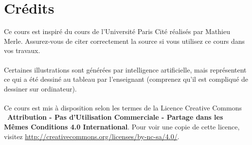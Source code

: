 \documentclass{article}
\begin{document}
\newpage
\tableofcontents
\section*{Crédits}
Ce cours est inspiré du cours de l'Université Paris Cité réalisés par Mathieu Merle. Assurez-vous de citer correctement la source si vous utilisez ce cours dans vos travaux.\\\\
Certaines illustrations sont générées par intelligence artificielle, mais représentent ce qui a été dessiné au tableau par l'enseignant (comprenez qu'il est compliqué de dessiner sur ordinateur).\\\\
Ce cours est mis à disposition selon les termes de la Licence Creative Commons \ccbyncsa\ \textbf{Attribution - Pas d'Utilisation Commerciale - Partage dans les Mêmes Conditions 4.0 International}. 
Pour voir une copie de cette licence, visitez \url{http://creativecommons.org/licenses/by-nc-sa/4.0/}.
\end{document}
